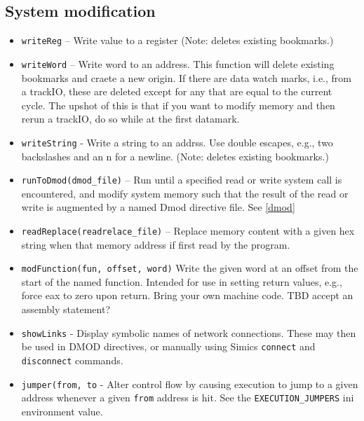 \documentclass[titlepage]{article}
\begin{document}
\subsection{System modification}
\label{sec:modification}
\begin{itemize}

\item {\tt writeReg} – Write value to a register (Note: deletes existing bookmarks.)
\item {\tt writeWord} – Write word to an address. This function will delete existing bookmarks and craete a new origin.  If there are data watch marks,
i.e., from a trackIO, these are deleted except for any that are equal to the current cycle.  The upshot of this is that if you want to modify memory
and then rerun a trackIO, do so while at the first datamark.
\item {\tt writeString} - Write a string to an addrss. Use double escapes, e.g., two backslashes and an n for a newline. (Note: deletes existing bookmarks.)

\item {\tt runToDmod(dmod\_file)} – Run until a specified read or write system call is encountered, and modify system memory such
that the result of the read or write is augmented by a named Dmod directive file.  See \ref{dmod}

\item {\tt readReplace(readrelace\_file)} – Replace memory content with a given hex string when that memory address if first read by the program.

\item {\tt modFunction(fun, offset, word)} Write the given word at an offset from the start of the named function.  Intended for use in setting return
values, e.g., force eax to zero upon return.  Bring your own machine code.  TBD accept an assembly statement?

\item {\tt showLinks} - Display symbolic names of network connections.  These may then be used in DMOD directives, or manually using Simics {\tt connect}
and {\tt disconnect} commands.

\item {\tt jumper(from, to} - Alter control flow by causing execution to jump to a given address whenever a given {\tt from} address is hit.  See
the {\tt EXECUTION\_JUMPERS} ini environment value.

\end{itemize}
\end{document}
